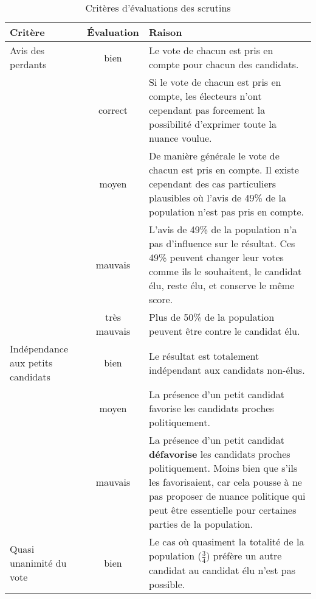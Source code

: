 \documentclass[../report]{subfiles}
\begin{document}
  \begin{table}
  \caption{Critères d'évaluations des scrutins}%
  \label{tab:criteres:scrutin}%
  \begin{center}
    \begin{tabular}{p{8em}|c|p{28em}}
      \hline
      Critère & Évaluation & Raison \\
      \hline
      \hline
      Avis des perdants & \cellcolor{green}bien & Le vote de chacun est pris en compte pour chacun des candidats. \\
      \cline{2-3}       & \cellcolor{green!25!yellow}correct & Si le vote de chacun est pris en compte, les électeurs n'ont cependant pas forcement la possibilité d'exprimer toute la nuance voulue. \\
      \cline{2-3}       & \cellcolor{orange}moyen & De manière générale le vote de chacun est pris en compte. Il existe cependant des cas particuliers plausibles où l'avis de 49\% de la population n'est pas pris en compte. \\
      \cline{2-3}       & \cellcolor{red}mauvais & L'avis de 49\% de la population n'a pas d’influence sur le résultat. Ces 49\% peuvent changer leur votes comme ils le souhaitent, le candidat élu, reste élu, et conserve le même score. \\
      \cline{2-3}       & \cellcolor{red}très mauvais & Plus de 50\% de la population peuvent être contre le candidat élu. \\
      \hline
      Indépendance aux petits candidats & \cellcolor{green}bien & Le résultat est totalement indépendant aux candidats non-élus. \\
      \cline{2-3}
                       & \cellcolor{orange}moyen & La présence d'un petit candidat favorise les candidats proches politiquement. \\
      \cline{2-3}
                       & \cellcolor{red}mauvais &  La présence d'un petit candidat \textbf{défavorise} les candidats proches politiquement. Moins bien que s'ils les favorisaient, car cela pousse à ne pas proposer de nuance politique qui peut être essentielle pour certaines parties de la population. \\
      \hline
      Quasi unanimité du vote  & \cellcolor{green}bien & Le cas où quasiment la totalité de la population ($\frac{3}{4}$) préfère un autre candidat au candidat élu n'est pas possible. \\

\end{tabular}
\end{center}
\end{table}
\end{document}
